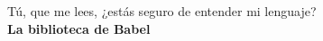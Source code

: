 \begin{dedicatoria}
\vspace{2cm}
\vspace{8cm}

\flushright{}
\large Tú, que me lees, ¿estás seguro de entender mi lenguaje? \\
\vspace{2mm}
\large\textbf{La biblioteca de Babel}
\end{dedicatoria}
